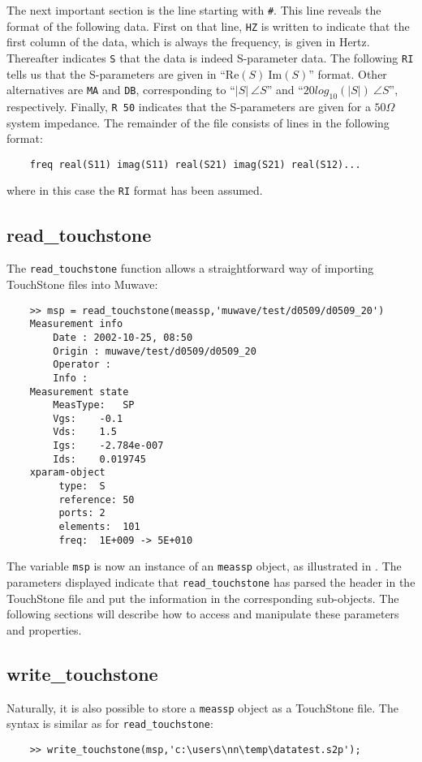 The next important section is the line starting with \verb"#".
This line reveals the format of the following data. First on that
line, \verb"HZ" is written to indicate that the first column of
the data, which is always the frequency, is given in Hertz.
Thereafter indicates \verb"S" that the data is indeed S-parameter
data. The following \verb"RI" tells us that the S-parameters are
given in ``$\mathrm{Re}(S)~\mathrm{Im}(S)$'' format. Other
alternatives are \verb"MA" and \verb"DB", corresponding to
``$|S|~\angle S$'' and ``$20 log_{10}(|S|)~\angle S$'',
respectively. Finally, \verb"R 50" indicates that the S-parameters
are given for a $50 \Omega$ system impedance. The remainder of the
file consists of lines in the following format:
\begin{small}
\begin{verbatim}
    freq real(S11) imag(S11) real(S21) imag(S21) real(S12)...
\end{verbatim}
\end{small}
where in this case the \verb"RI" format has been assumed.

\subsection{read\_touchstone}
The \verb"read_touchstone" function allows a straightforward way
of importing TouchStone files into Muwave:

\begin{small}
\begin{verbatim}
    >> msp = read_touchstone(meassp,'muwave/test/d0509/d0509_20')
    Measurement info
        Date : 2002-10-25, 08:50
        Origin : muwave/test/d0509/d0509_20
        Operator :
        Info :
    Measurement state
    	MeasType:	SP
    	Vgs:	-0.1
    	Vds:	1.5
    	Igs:	-2.784e-007
    	Ids:	0.019745
    xparam-object
    	 type:	S
    	 reference:	50
    	 ports:	2
    	 elements:	101
    	 freq:	1E+009 -> 5E+010
\end{verbatim}
\end{small}

The variable \verb"msp" is now an instance of an \verb"meassp"
object, as illustrated in . The parameters
displayed indicate that \verb"read_touchstone" has parsed the
header in the TouchStone file and put the information in the
corresponding sub-objects. The following sections will describe
how to access and manipulate these parameters and properties.

\subsection{write\_touchstone}
Naturally, it is also possible to store a \verb"meassp" object as
a TouchStone file. The syntax is similar as for
\verb"read_touchstone":
\begin{small}
\begin{verbatim}
    >> write_touchstone(msp,'c:\users\nn\temp\datatest.s2p');
\end{verbatim}
\end{small}
